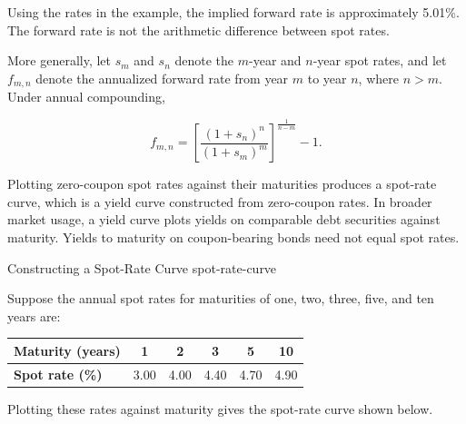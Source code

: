 Using the rates in the example, the implied forward
rate is approximately 5.01\%. The forward rate is not the arithmetic difference between
spot rates.

More generally, let $s_m$ and $s_n$ denote the
$m$-year and $n$-year spot rates, and let $f_{m,n}$
denote the annualized forward rate from year $m$
to year $n$, where $n>m$. Under annual compounding,

\begin{equation}
f_{m,n}
=
\left[
\frac{(1+s_n)^n}{(1+s_m)^m}
\right]^{\frac{1}{n-m}}
-1.
\label{eq:ch6-general-forward-rate}
\end{equation}

Plotting zero-coupon spot rates against their maturities
produces a spot-rate curve, which is a yield curve
constructed from zero-coupon rates. In broader market
usage, a yield curve plots yields on comparable debt
securities against maturity. Yields to maturity on
coupon-bearing bonds need not equal spot rates.


\begin{example}{Constructing a Spot-Rate Curve}
{spot-rate-curve}

Suppose the annual spot rates for maturities of one, two, three, five, and ten years are:

\begin{center}
\begin{tabular}{lccccc}
\toprule
\textbf{Maturity (years)} & 1 & 2 & 3 & 5 & 10 \\
\midrule
\textbf{Spot rate (\%)} & 3.00 & 4.00 & 4.40 & 4.70 & 4.90 \\
\bottomrule
\end{tabular}
\end{center}

Plotting these rates against maturity gives the spot-rate curve shown below.

\begin{center}
\end{center}
\end{example}



